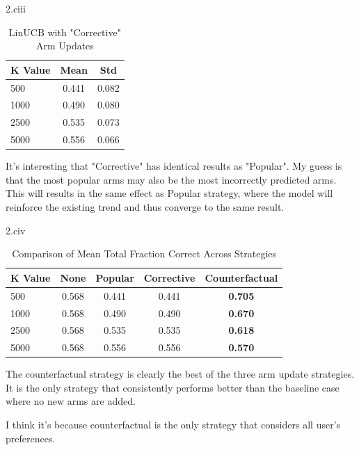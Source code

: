 \LARGE
2.ciii
\normalsize

\begin{answer}
  \begin{table}[h!]
  \centering
  \caption{LinUCB with "Corrective" Arm Updates}
  \begin{tabular}{|l|c|c|}
  \hline
  \textbf{K Value} & \textbf{Mean} & \textbf{Std} \\ \hline
  500              & 0.441         & 0.082        \\ \hline
  1000             & 0.490         & 0.080        \\ \hline
  2500             & 0.535         & 0.073        \\ \hline
  5000             & 0.556         & 0.066        \\ \hline
  \end{tabular}
  \end{table}

  It's interesting that "Corrective" has identical results as "Popular".
  My guess is that the most popular arms may also be the most incorrectly
  predicted arms. This will results in the same effect as Popular strategy,
  where the model will reinforce the existing trend and thus converge to
  the same result.
\end{answer}
\clearpage

\LARGE
2.civ
\normalsize

\begin{answer}
  \begin{table}[h!]
  \centering
  \caption{Comparison of Mean Total Fraction Correct Across Strategies}
  \begin{tabular}{|l|c|c|c|c|}
  \hline
  \textbf{K Value} & \textbf{None} & \textbf{Popular} & \textbf{Corrective} & \textbf{Counterfactual} \\ \hline
  500              & 0.568         & 0.441            & 0.441               & \textbf{0.705}          \\ \hline
  1000             & 0.568         & 0.490            & 0.490               & \textbf{0.670}          \\ \hline
  2500             & 0.568         & 0.535            & 0.535               & \textbf{0.618}          \\ \hline
  5000             & 0.568         & 0.556            & 0.556               & \textbf{0.570}          \\ \hline
  \end{tabular}
  \end{table}

  The counterfactual strategy is clearly the best of the three arm update
  strategies. It is the only strategy that consistently performs better
  than the baseline case where no new arms are added.

  I think it's because counterfactual is the only strategy that considers
  all user's preferences.
\end{answer}
\clearpage

